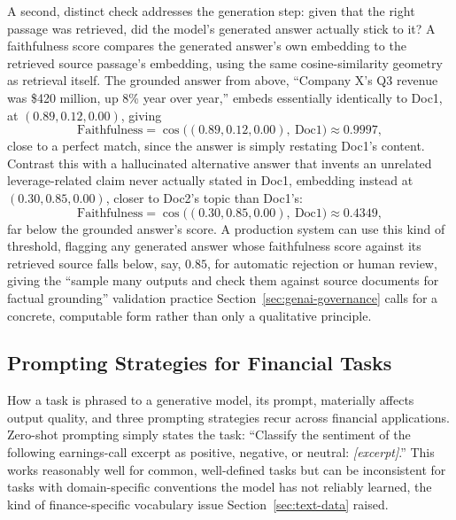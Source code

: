 \documentclass[../ai_in_finance]{subfiles}
\begin{document}
A second, distinct check addresses the generation step: given that the right passage was retrieved, did the model's generated answer actually stick to it? A faithfulness score compares the generated answer's own embedding to the retrieved source passage's embedding, using the same cosine-similarity geometry as retrieval itself. The grounded answer from above, ``Company X's Q3 revenue was \$420 million, up 8\% year over year,'' embeds essentially identically to Doc1, at $(0.89, 0.12, 0.00)$, giving
\begin{equation*}
\text{Faithfulness} = \cos\big((0.89, 0.12, 0.00),\ \text{Doc1}\big) \approx 0.9997,
\end{equation*}
close to a perfect match, since the answer is simply restating Doc1's content. Contrast this with a hallucinated alternative answer that invents an unrelated leverage-related claim never actually stated in Doc1, embedding instead at $(0.30, 0.85, 0.00)$, closer to Doc2's topic than Doc1's:
\begin{equation*}
\text{Faithfulness} = \cos\big((0.30, 0.85, 0.00),\ \text{Doc1}\big) \approx 0.4349,
\end{equation*}
far below the grounded answer's score. A production system can use this kind of threshold, flagging any generated answer whose faithfulness score against its retrieved source falls below, say, $0.85$, for automatic rejection or human review, giving the ``sample many outputs and check them against source documents for factual grounding'' validation practice Section~\ref{sec:genai-governance} calls for a concrete, computable form rather than only a qualitative principle.

\subsection{Prompting Strategies for Financial Tasks}
\label{sec:prompting}

How a task is phrased to a generative model, its prompt, materially affects output quality, and three prompting strategies recur across financial applications. Zero-shot prompting simply states the task: ``Classify the sentiment of the following earnings-call excerpt as positive, negative, or neutral: \emph{[excerpt]}.'' This works reasonably well for common, well-defined tasks but can be inconsistent for tasks with domain-specific conventions the model has not reliably learned, the kind of finance-specific vocabulary issue Section~\ref{sec:text-data} raised.
\end{document}
